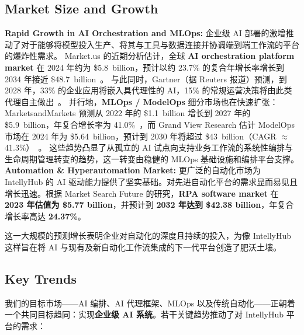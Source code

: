 \documentclass[11pt, a4paper, oneside]{article}
\begin{document}
\subsection{Market Size and Growth}
\textbf{Rapid Growth in AI Orchestration and MLOps:} 企业级 AI 部署的激增推动了对于能够将模型投入生产、将其与工具与数据连接并协调端到端工作流的平台的爆炸性需求。  
Market.us 的近期分析估计，全球 \textbf{AI orchestration platform market} 在 2024 年约为 \$5.8~billion，预计以约 23.7\% 的复合年增长率增长到 2034 年接近 \$48.7~billion~\cite{AIOrch}。  
与此同时，Gartner（据 Reuters 报道）预测，到 2028 年，33\% 的企业应用将嵌入具代理性的 AI，15\% 的常规运营决策将由此类代理自主做出~\cite{GartnerAgentic}。  
并行地，\textbf{MLOps / ModelOps} 细分市场也在快速扩张：MarketsandMarkets 预测从 2022 年的 \$1.1~billion 增长到 2027 年的 \$5.9~billion，年复合增长率为 41.0\%~\cite{MLOpsMM}，而 Grand View Research 估计 ModelOps 市场在 2024 年为 \$5.64~billion，预计到 2030 年将超过 \$43~billion（CAGR $\approx$ 41.3\%）~\cite{ModelOpsGV}。  
这些趋势凸显了从孤立的 AI 试点向支持业务工作流的系统性编排与生命周期管理转变的趋势，这一转变由稳健的 MLOps 基础设施和编排平台支撑。\newline\newline
\textbf{Automation \& Hyperautomation Market:} 更广泛的自动化市场为 IntellyHub 的 AI 驱动能力提供了坚实基础。对先进自动化平台的需求显而易见且增长迅速。根据 Market Search Future 的研究，\textbf{RPA software market} 在 \textbf{2023 年估值为 \$5.77 billion}，并预计到 \textbf{2032 年达到 \$42.38 billion}，年复合增长率高达 \textbf{24.37\%}\cite{mrfRPA}。

这一大规模的预测增长表明企业对自动化的深度且持续的投入，为像 IntellyHub 这样旨在将 AI 与现有及新自动化工作流集成的下一代平台创造了肥沃土壤。

\subsection{Key Trends}
我们的目标市场——AI 编排、AI 代理框架、MLOps 以及传统自动化——正朝着一个共同目标趋同：实现\textbf{企业级 AI 系统}。若干关键趋势推动了对 IntellyHub 平台的需求：
\end{document}
